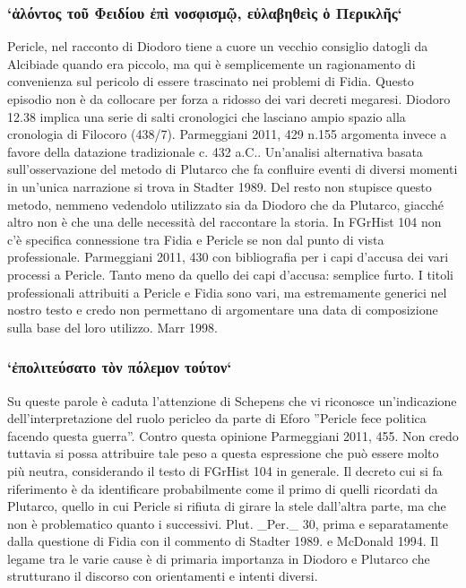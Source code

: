 {            \subsubsection{`ἁλόντος τοῦ Φειδίου ἐπὶ νοσφισμῷ, εὐλαβηθεὶς ὁ Περικλῆς`}
            Pericle, nel racconto di  Diodoro tiene a cuore un vecchio consiglio datogli da Alcibiade quando era piccolo, ma qui è semplicemente un ragionamento di convenienza sul pericolo di essere trascinato nei problemi di Fidia. 
            Questo episodio non è da collocare per forza a ridosso dei vari decreti megaresi.  Diodoro 12.38 implica una serie di salti cronologici che lasciano ampio spazio alla cronologia di Filocoro (438/7). Parmeggiani 2011, 429 n.155 argomenta invece a favore della datazione tradizionale c. 432 a.C.. Un'analisi alternativa basata sull'osservazione del metodo di Plutarco che fa confluire eventi di diversi momenti in un'unica narrazione si trova in Stadter 1989. Del resto non stupisce questo metodo, nemmeno vedendolo utilizzato sia da  Diodoro che da Plutarco, giacché altro non è che una delle necessità del raccontare la storia. In FGrHist 104 non c'è specifica connessione tra Fidia e Pericle  se non dal punto di vista professionale. Parmeggiani 2011, 430 con bibliografia per i capi d'accusa dei vari processi a Pericle. Tanto meno da quello dei capi d'accusa: semplice furto. I titoli professionali attribuiti a Pericle  e Fidia sono vari, ma estremamente generici nel nostro testo e credo non permettano di argomentare una data di composizione sulla base del loro utilizzo. Marr 1998.
            
            \subsubsection{`ἐπολιτεύσατο τὸν πόλεμον τούτον`}
            Su queste parole è caduta l'attenzione di Schepens che vi riconosce un'indicazione dell'interpretazione del ruolo pericleo da parte di Eforo ''Pericle fece politica facendo questa guerra''. Contro questa opinione Parmeggiani 2011, 455. Non credo tuttavia si possa attribuire tale peso a questa espressione che può essere molto più neutra, considerando il testo di FGrHist 104 in generale. Il decreto cui si fa riferimento è da identificare probabilmente come il primo di quelli ricordati da Plutarco, quello in cui Pericle  si rifiuta di girare la stele dall'altra parte, ma che non è problematico quanto i successivi. Plut. _Per._ 30, prima e separatamente dalla questione di Fidia con il commento di Stadter 1989. e McDonald 1994. Il legame tra le varie cause è di primaria importanza in  Diodoro e Plutarco che strutturano il discorso con orientamenti e intenti diversi. 
            
}
